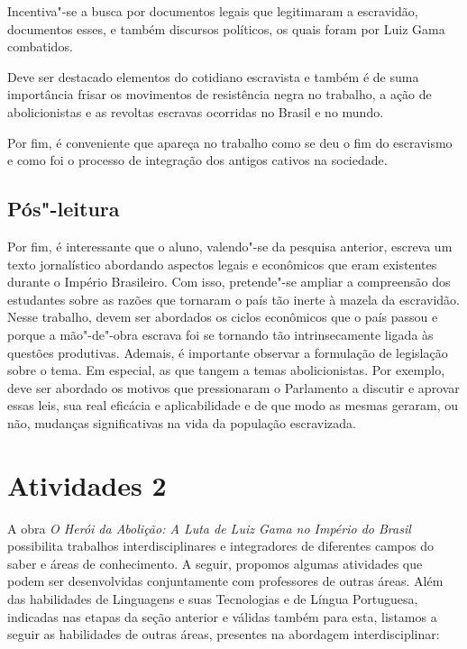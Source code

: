 \documentclass[12pt]{extarticle}
\begin{document}
Incentiva"-se a busca por documentos legais que legitimaram a escravidão,
documentos esses, e também discursos políticos, os quais foram por Luiz
Gama combatidos.




Deve ser destacado elementos do cotidiano escravista e também é de suma
importância frisar os movimentos de resistência negra no trabalho, a
ação de abolicionistas e as revoltas escravas ocorridas no Brasil e no
mundo.

Por fim, é conveniente que apareça no trabalho como se deu o fim do
escravismo e como foi o processo de integração dos antigos cativos na
sociedade.

\subsection{Pós"-leitura}


Por fim, é interessante que o aluno, valendo"-se da pesquisa
anterior, escreva um texto jornalístico abordando aspectos legais e
econômicos que eram existentes durante o Império Brasileiro. Com isso,
pretende"-se ampliar a compreensão dos estudantes sobre as razões que
tornaram o país tão inerte à mazela da escravidão. Nesse trabalho, devem
ser abordados os ciclos econômicos que o país passou e porque a
mão"-de"-obra escrava foi se tornando tão intrinsecamente ligada às
questões produtivas. Ademais, é importante observar a formulação de
legislação sobre o tema. Em especial, as que tangem a temas
abolicionistas. Por exemplo, deve ser abordado os motivos que
pressionaram o Parlamento a discutir e aprovar essas leis, sua real
eficácia e aplicabilidade e de que modo as mesmas geraram, ou não,
mudanças significativas na vida da população escravizada.

\section{Atividades 2}

A obra \emph{O Herói da Abolição: A Luta de Luiz Gama no Império do
Brasil} possibilita trabalhos interdisciplinares e integradores de
diferentes campos do saber e áreas de conhecimento. A seguir, propomos
algumas atividades que podem ser desenvolvidas conjuntamente com
professores de outras áreas. Além das habilidades de Linguagens e suas
Tecnologias e de Língua Portuguesa, indicadas nas etapas da seção
anterior e válidas também para esta, listamos a seguir as habilidades de
outras áreas, presentes na abordagem interdisciplinar:
\end{document}
